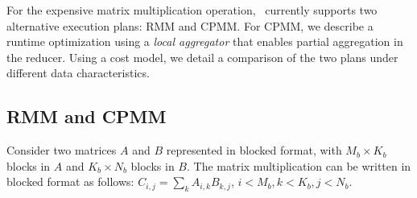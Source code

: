 
For the expensive matrix multiplication operation, \systemmltext\ currently supports two 
alternative execution plans: RMM and CPMM. For CPMM, we describe a runtime optimization 
using a {\it local aggregator} that enables partial aggregation in the reducer. Using a 
cost model, we detail a comparison of the two plans under different data characteristics.

\subsection{RMM and CPMM}
Consider two matrices $A$ and $B$ represented in blocked format, with $M_b \times K_b$ blocks in $A$ and $K_b \times N_b$ blocks in $B$. The matrix multiplication can be written in blocked format as follows: $C_{i,j}=\sum_k{ A_{i,k}B_{k,j}}$, $i < M_b, k < K_b, j < N_b$.

